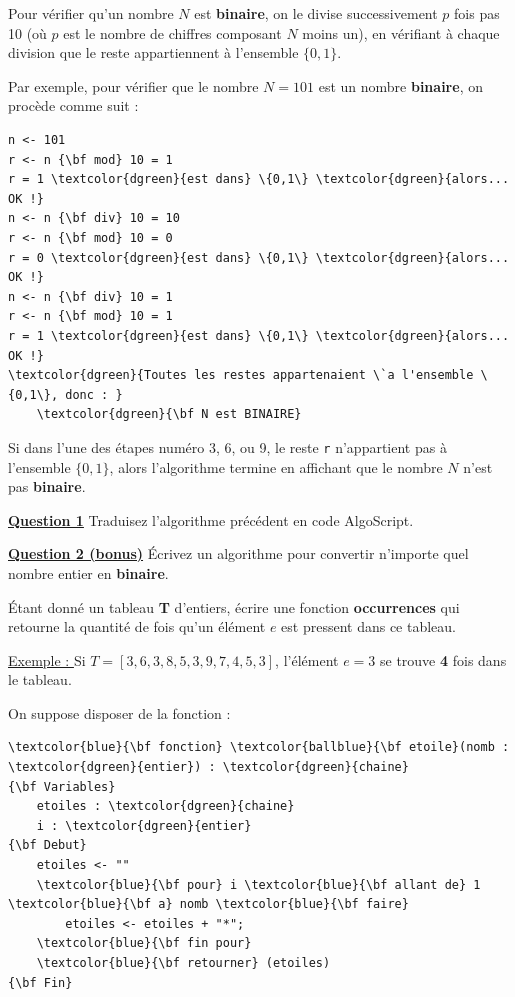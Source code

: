 \documentclass[11pt]{exam}
\begin{document}
\begin{questions}

\question Pour v\'erifier qu'un nombre $N$ est \textbf{binaire}, on le divise successivement $p$ fois pas 10 (o\`u $p$ est le nombre de chiffres composant $N$ moins un), en v\'erifiant \`a chaque division que le reste appartiennent \`a l'ensemble $\{0,1\}$.

Par exemple, pour v\'erifier que le nombre $N = 101$ est un nombre \textbf{binaire}, on proc\`ede comme suit :

\begin{Verbatim}
n <- 101
r <- n {\bf mod} 10 = 1
r = 1 \textcolor{dgreen}{est dans} \{0,1\} \textcolor{dgreen}{alors... OK !}
n <- n {\bf div} 10 = 10
r <- n {\bf mod} 10 = 0
r = 0 \textcolor{dgreen}{est dans} \{0,1\} \textcolor{dgreen}{alors... OK !}
n <- n {\bf div} 10 = 1
r <- n {\bf mod} 10 = 1
r = 1 \textcolor{dgreen}{est dans} \{0,1\} \textcolor{dgreen}{alors... OK !}
\textcolor{dgreen}{Toutes les restes appartenaient \`a l'ensemble \{0,1\}, donc : }
	\textcolor{dgreen}{\bf N est BINAIRE}
\end{Verbatim}

Si dans l'une des \'etapes num\'ero 3, 6, ou 9, le reste \texttt{r} n'appartient pas \`a l'ensemble $\{0,1\}$, alors l'algorithme termine en affichant que le nombre $N$ n'est pas \textbf{binaire}.

\underline{\bf Question 1} Traduisez l'algorithme pr\'ec\'edent en code {\sc AlgoScript}.

\underline{\bf Question 2 (bonus)} \'Ecrivez un algorithme pour convertir n'importe quel nombre entier en \textbf{binaire}.

\question \'Etant donn\'e un tableau \textbf{T} d'entiers, \'ecrire une fonction \textcolor{ballblue}{\bf occurrences} qui retourne la quantit\'e de fois qu'un \'el\'ement $e$ est pressent dans ce tableau.

\underline{Exemple : } Si $T = [3, 6, 3, 8, 5, 3, 9, 7, 4, 5, 3]$, l'\'el\'ement $e = 3$ se trouve \textbf{4} fois dans le tableau.

\newpage
\question On suppose disposer de la fonction :

\begin{Verbatim}
\textcolor{blue}{\bf fonction} \textcolor{ballblue}{\bf etoile}(nomb : \textcolor{dgreen}{entier}) : \textcolor{dgreen}{chaine}
{\bf Variables}
	etoiles : \textcolor{dgreen}{chaine}
	i : \textcolor{dgreen}{entier}
{\bf Debut}
	etoiles <- ""
	\textcolor{blue}{\bf pour} i \textcolor{blue}{\bf allant de} 1 \textcolor{blue}{\bf a} nomb \textcolor{blue}{\bf faire} 
		etoiles <- etoiles + "*"; 
	\textcolor{blue}{\bf fin pour}
	\textcolor{blue}{\bf retourner} (etoiles) 
{\bf Fin}
\end{Verbatim}


\end{questions}
\end{document}
